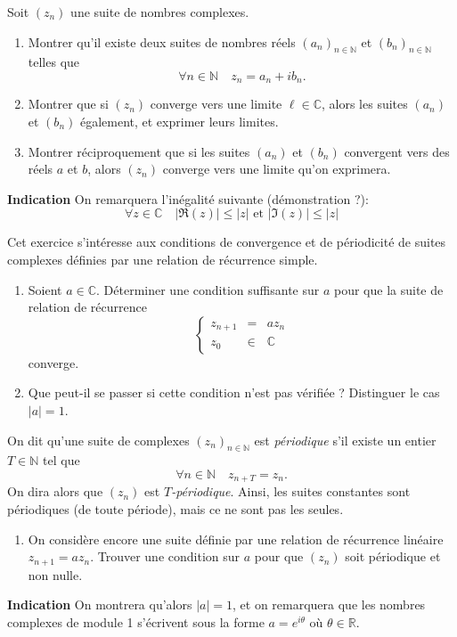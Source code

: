 \documentclass[12pt]{article}
\newcommand{\RR}{\mathbb R}
\newcommand{\CC}{\mathbb C}
\newcommand{\NN}{\mathbb N}
\theoremstyle{definition}
\begin{document}
\begin{exer}
Soit $(z_n)$ une suite de nombres complexes.\begin{enumerate}
	\item Montrer qu'il existe deux suites de nombres réels $(a_n)_{n\in\NN}$ et $(b_n)_{n\in\NN}$ telles que
	\[
	\forall n\in\NN \quad z_n = a_n + ib_n.
	\]
	\item Montrer que si $(z_n)$ converge vers une limite $\ell\in\CC$, alors les suites $(a_n)$ et $(b_n)$ également, et exprimer leurs limites.
	\item Montrer réciproquement que si les suites $(a_n)$ et $(b_n)$ convergent vers des réels $a$ et $b$, alors $(z_n)$ converge vers une limite qu'on exprimera.
\end{enumerate} 
\noindent\textbf{Indication} On remarquera l'inégalité suivante (démonstration ?):
\[
\forall z\in\CC \quad |\Re(z)| \leq |z|\text{ et }|\Im(z)| \leq |z|
\]
\end{exer}

\begin{exer}
Cet exercice s'intéresse aux conditions de convergence et de périodicité de suites complexes définies par une relation de récurrence simple.
\begin{enumerate}
	\item Soient $a\in\CC$. Déterminer une condition suffisante sur $a$ pour que la suite de relation de récurrence
	\[
	\left\{
	\begin{array}{rll}
	z_{n+1} &= &az_n\\
	z_0 &\in &\CC
	\end{array}
	\right.
	\]
	converge.
	\item Que peut-il se passer si cette condition n'est pas vérifiée ? Distinguer le cas $|a| = 1$.
\end{enumerate}
On dit qu'une suite de complexes $(z_n)_{n\in\NN}$ est \textit{périodique} s'il existe un entier $T\in\NN$ tel que
\[
\forall n\in\NN\quad z_{n+T} = z_n.
\]
On dira alors que $(z_n)$ est \textit{$T$-périodique}. Ainsi, les suites constantes sont périodiques (de toute période), mais ce ne sont pas les seules.
\begin{enumerate}[resume]
	\item On considère encore une suite définie par une relation de récurrence linéaire $z_{n+1} = az_n$. Trouver une condition sur $a$ pour que $(z_n)$ soit périodique et non nulle.
\end{enumerate}

\noindent\textbf{Indication} On montrera qu'alors $|a| = 1$, et on remarquera que les nombres complexes de module 1 s'écrivent sous la forme $a = e^{i\theta}$ où $\theta\in\RR$.
\end{exer}
\end{document}
